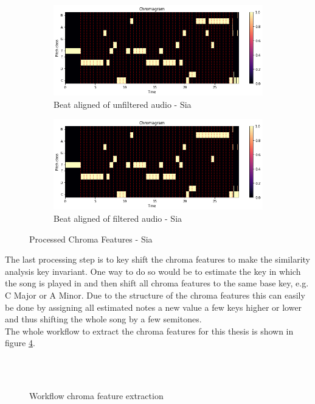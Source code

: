 \begin{figure}[htbp]
{{			\begin{subfigure}{.495\textwidth}
				\centering    
				\includegraphics[scale=0.3]{Images/Chroma/siaunfiltered.png}
				\caption{Beat aligned of unfiltered audio - Sia}
				\label{siaub}
			\end{subfigure}
			\begin{subfigure}{.495\textwidth}
				\centering     
				\includegraphics[scale=0.3]{Images/Chroma/siafiltered.png}
				\caption{Beat aligned of filtered audio - Sia}
				\label{siafb}
			\end{subfigure}%
	}}
	\caption{Processed Chroma Features - Sia}
	\label{beataligned}
\end{figure}
The last processing step is to key shift the chroma features to make the similarity analysis key invariant. One way to do so would be to estimate the key in which the song is played in and then shift all chroma features to the same base key, e.g. C Major or A Minor. Due to the structure of the chroma features this can easily be done by assigning all estimated notes a new value a few keys higher or lower and thus shifting the whole song by a few semitones.\\
The whole workflow to extract the chroma features for this thesis is shown in figure \ref{workflowchrom}.
\begin{figure}[htbp]
	\centering
	\ \\
	 \\
	\caption{Workflow chroma feature extraction}
	\label{workflowchrom}
\end{figure}
